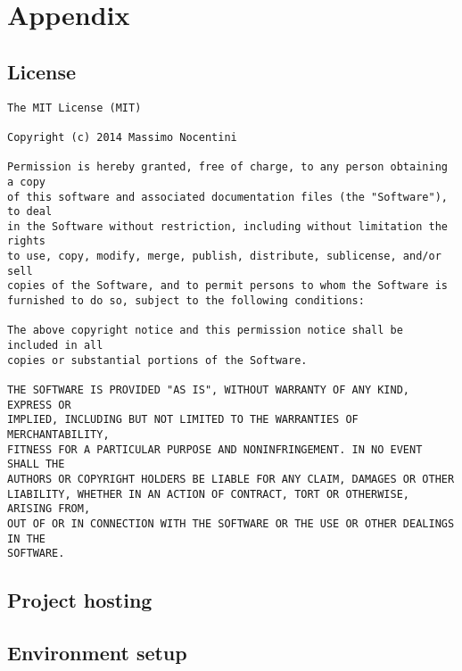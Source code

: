 \documentclass[10pt,a4paper]{article}
\begin{document}
    \section{Appendix}
    \label{sec:appendix}

    \subsection{License}
\begin{verbatim}
The MIT License (MIT)

Copyright (c) 2014 Massimo Nocentini

Permission is hereby granted, free of charge, to any person obtaining a copy
of this software and associated documentation files (the "Software"), to deal
in the Software without restriction, including without limitation the rights
to use, copy, modify, merge, publish, distribute, sublicense, and/or sell
copies of the Software, and to permit persons to whom the Software is
furnished to do so, subject to the following conditions:

The above copyright notice and this permission notice shall be included in all
copies or substantial portions of the Software.

THE SOFTWARE IS PROVIDED "AS IS", WITHOUT WARRANTY OF ANY KIND, EXPRESS OR
IMPLIED, INCLUDING BUT NOT LIMITED TO THE WARRANTIES OF MERCHANTABILITY,
FITNESS FOR A PARTICULAR PURPOSE AND NONINFRINGEMENT. IN NO EVENT SHALL THE
AUTHORS OR COPYRIGHT HOLDERS BE LIABLE FOR ANY CLAIM, DAMAGES OR OTHER
LIABILITY, WHETHER IN AN ACTION OF CONTRACT, TORT OR OTHERWISE, ARISING FROM,
OUT OF OR IN CONNECTION WITH THE SOFTWARE OR THE USE OR OTHER DEALINGS IN THE
SOFTWARE.
\end{verbatim}

    \subsection{Project hosting}

    \subsection{Environment setup}

    
\end{document}
